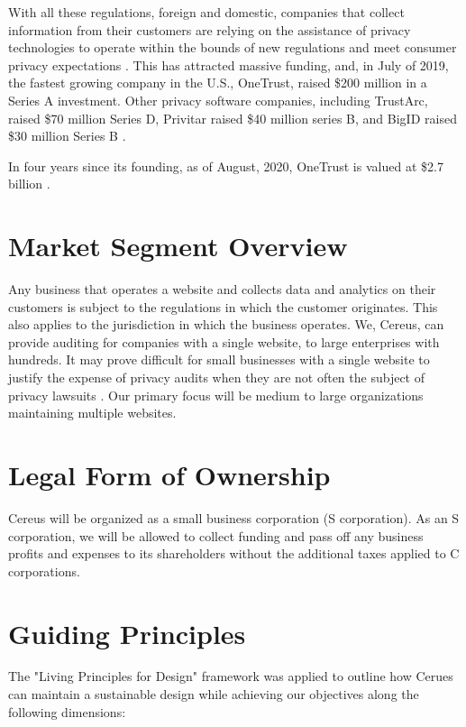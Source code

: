 With all these regulations, foreign and domestic, companies that collect information from their customers are relying on the assistance of privacy technologies to operate within the bounds of new regulations and meet consumer privacy expectations \cite{meehan.forbes.2019}. This has attracted massive funding, and, in July of 2019, the fastest growing company in the U.S., OneTrust, raised \$200 million in a Series A investment. Other privacy software companies, including TrustArc, raised \$70 million Series D, Privitar raised \$40 million series B, and BigID raised \$30 million Series B \cite{wood.fpf.2019}.

In four years since its founding, as of August, 2020, OneTrust is valued at \$2.7 billion \cite{hughes.iapp.2020}.

\section{Market Segment Overview}

Any business that operates a website and collects data and analytics on their customers is subject to the regulations in which the customer originates. This also applies to the jurisdiction in which the business operates. We, Cereus, can provide auditing for companies with a single website, to large enterprises with hundreds. It may prove difficult for small businesses with a single website to justify the expense of privacy audits when they are not often the subject of privacy lawsuits \cite{lanou.2020}. Our primary focus will be medium to large organizations maintaining multiple websites. 

\section{Legal Form of Ownership} \label{legal.ownership}

Cereus will be organized as a small business corporation (S corporation). As an S corporation, we will be allowed to collect funding and pass off any business profits and expenses to its shareholders without the additional taxes applied to C corporations.

\section{Guiding Principles} \label{guiding.principles}

The "Living Principles for Design" framework \cite{brink.aiga.2020} was applied to outline how Cerues can maintain a sustainable design while achieving our objectives along the following dimensions:


